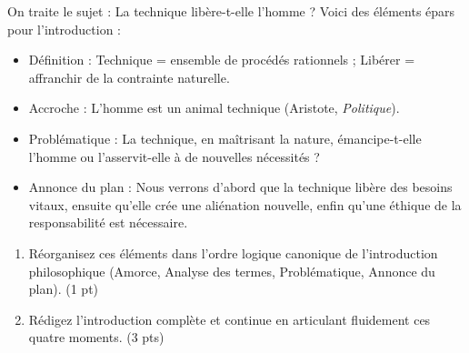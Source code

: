 \documentclass[11pt]{article}
\begin{document}
\begin{exercice}
On traite le sujet : \og La technique libère-t-elle l'homme ? \fg{} Voici des éléments épars pour l'introduction :
\begin{itemize}
    \item[A.] Définition : Technique = ensemble de procédés rationnels ; Libérer = affranchir de la contrainte naturelle.
    \item[B.] Accroche : \og L'homme est un animal technique \fg{} (Aristote, \textit{Politique}).
    \item[C.] Problématique : La technique, en maîtrisant la nature, émancipe-t-elle l'homme ou l'asservit-elle à de nouvelles nécessités ?
    \item[D.] Annonce du plan : Nous verrons d'abord que la technique libère des besoins vitaux, ensuite qu'elle crée une aliénation nouvelle, enfin qu'une éthique de la responsabilité est nécessaire.
\end{itemize}
\begin{enumerate}
    \item Réorganisez ces éléments dans l'ordre logique canonique de l'introduction philosophique (Amorce, Analyse des termes, Problématique, Annonce du plan). (1 pt)
    \item Rédigez l'introduction complète et continue en articulant fluidement ces quatre moments. (3 pts)
\end{enumerate}
\end{exercice}
\end{document}
